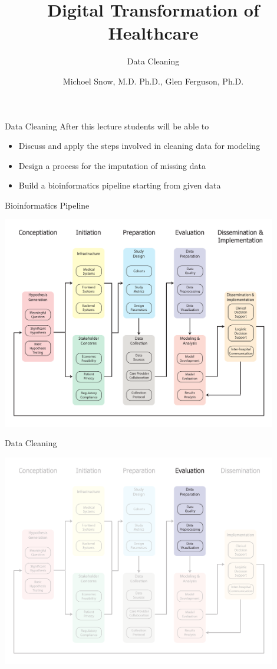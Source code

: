 \documentclass[10pt, xcolor=table]{beamer}
\title{Digital Transformation of Healthcare}
\subtitle{Data Cleaning}
\date{}
\author{Michoel Snow, M.D. Ph.D., Glen Ferguson, Ph.D.}
\institute{Center for Health Data Innovations}
\begin{document}
\maketitle


\begin{frame}{Data Cleaning}
	After this lecture students will be able to 
	\begin{itemize}
		\item Discuss and apply the steps involved in cleaning data for modeling
		\item Design a process for the imputation of missing data 
		\item Build a bioinformatics pipeline starting from given data
	\end{itemize}
\end{frame}


\begin{frame}{Bioinformatics Pipeline}
	\begin{center}
		\includegraphics[width=0.9\textwidth]{images/informatics_pipeline.pdf}	
	\end{center}
\end{frame}


\begin{frame}{Data Cleaning}
	\begin{center}
		\includegraphics[width=0.9\textwidth]{images/informatics_pipeline_data_quality.pdf}	
	\end{center}
\end{frame}
\end{document}
